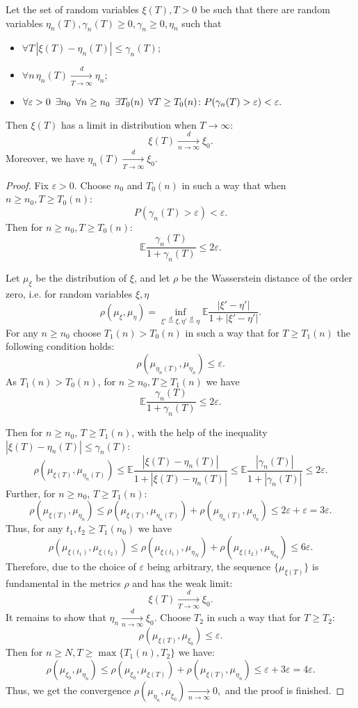 \documentclass[12pt, a4paper, titlepage]{article}
\begin{document}
\begin{lem}\label{WeakConvergenceThirdLem} 
 Let the set of random variables $\xi(T), T>0$ be such that there are random variables
 $\eta_n(T), \gamma_n(T)\ge 0, \gamma_n\ge 0, \eta_n$
 such that
\begin{itemize}
 \item $\forall T\, |\xi(T)-\eta_n(T)| \le \gamma_n(T)$;
 \item $\forall n \,\eta_n(T)\xrightarrow[T\to\infty]{d}\eta_n$;
 \item $\forall \varepsilon>0 \enskip \exists n_0 \enskip
\forall n \ge n_0 \enskip \exists T_0(n)\enskip \forall T \ge T_0(n) \colon
P(\gamma_n(T)>\varepsilon)<\varepsilon.$
\end{itemize}
Then $\xi(T)$ has a limit in distribution when $T\to\infty$:
$$\xi(T)\xrightarrow[n \to \infty]{d}\xi_0.$$
Moreover, we have $\eta_n(T)\xrightarrow[T\to\infty]{d}\xi_0.$
\end{lem}
\begin{proof}
 Fix $\varepsilon>0$. Choose $n_0$ and $T_0(n)$
 in such a way that when $n \ge n_0, T \ge T_0(n)$:
 $$P(\gamma_n(T)>\varepsilon)<\varepsilon.$$
 Then for $n \ge n_0, T \ge T_0(n)$:
 $$\mathbb{E}\frac{\gamma_n(T)}{1+\gamma_n(T)} \le 2\varepsilon.$$
 
 Let $\mu_{\xi}$ be the distribution of $\xi$,
 and let $\rho$ be the Wasserstein distance of the order zero, 
 i.e. for random variables $\xi, \eta$
 $$\rho(\mu_{\xi}, \mu_{\eta})=\inf\limits_{\xi'\stackrel{d}{=}\xi, \eta'\stackrel{d}{=}\eta}
  \mathbb{E}\frac{|\xi'-\eta'|}{1+|\xi'-\eta'|}.$$
 For any $n \ge n_0$ choose $T_1(n)>T_0(n)$ in such a way that for $T \ge T_1(n)$ 
 the following condition holds:
  $$\rho(\mu_{\eta_n(T)}, \mu_{\eta_n})\le \varepsilon.$$
 As $T_1(n)>T_0(n)$, for $n \ge n_0, T \ge T_1(n)$ we have
 $$\mathbb{E}\frac{\gamma_n(T)}{1+\gamma_n(T)}\le 2\varepsilon.$$

 Then for $n \ge n_0$, $T\ge T_1(n)$, with the help of the inequality $|\xi(T)-\eta_n(T)|\le \gamma_n(T)$:
$$\rho(\mu_{\xi(T)},\mu_{\eta_n(T)})\le \mathbb{E}\frac{|\xi(T)-\eta_n(T)|}{1+|\xi(T)-\eta_n(T)|}\le
\mathbb{E}\frac{|\gamma_n(T)|}{1+|\gamma_n(T)|}\le 2\varepsilon.$$
Further, for $n \ge n_0$, $T\ge T_1(n)$:
$$\rho(\mu_{\xi(T)},\mu_{\eta_n})\le\rho(\mu_{\xi(T)}, \mu_{\eta_n(T)})+\rho(\mu_{\eta_n(T)},\mu_{\eta_n})
\le 2\varepsilon+\varepsilon = 3\varepsilon.$$
Thus, for any $t_1, t_2\ge T_1(n_0)$ we have
$$\rho(\mu_{\xi(t_1)}, \mu_{\xi(t_2)})\le \rho(\mu_{\xi(t_1)}, \mu_{\eta_N})+
\rho(\mu_{\xi(t_2)}, \mu_{\eta_{n_0}})\le 6 \varepsilon.$$
Therefore, due to the choice of $\varepsilon$ being arbitrary, the sequence
$\{\mu_{\xi(T)}\}$ is fundamental in the metrics $\rho$ and has the weak limit:
$$\xi(T)\xrightarrow[T\to\infty]{d} \xi_0.$$
It remains to show that $\eta_n\xrightarrow[n\to\infty]{d}\xi_0.$
Choose $T_2$ in such a way that for $T\ge T_2$:
$$\rho(\mu_{\xi(T)}, \mu_{\xi_0})\le \varepsilon.$$
Then for $n\ge N, T\ge \max\{T_1(n), T_2\}$ we have:
$$\rho(\mu_{\xi_0}, \mu_{\eta_n})
\le 
\rho(\mu_{\xi_0}, \mu_{\xi(T)})+
\rho(\mu_{\xi(T)}, \mu_{\eta_n})
\le
\varepsilon+3\varepsilon=4\varepsilon.$$
Thus, we get the convergence $\rho(\mu_{\eta_n}, \mu_{\xi_0}) \xrightarrow[n\to\infty]{}0,$
and the proof is finished. 
\end{proof}
\end{document}
